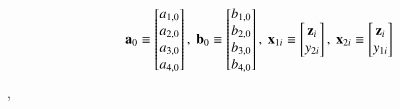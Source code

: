     \[
    \bolda_0 \equiv \begin{bmatrix}
        a_{1, 0}\\
        a_{2, 0}\\
        a_{3, 0}\\
        a_{4, 0}
        \end{bmatrix}    
        , \  
        \boldb_0 \equiv \begin{bmatrix}
            b_{1, 0}\\
            b_{2, 0}\\
            b_{3, 0}\\
            b_{4, 0}
            \end{bmatrix}   
            , \ 
            \boldx_{1i} \equiv \begin{bmatrix}
                \boldz_i\\
                y_{2i}
                \end{bmatrix}     
                , \ 
                \boldx_{2i} \equiv \begin{bmatrix}
                    \boldz_i\\
                    y_{1i}
                    \end{bmatrix}     
    \],
    
